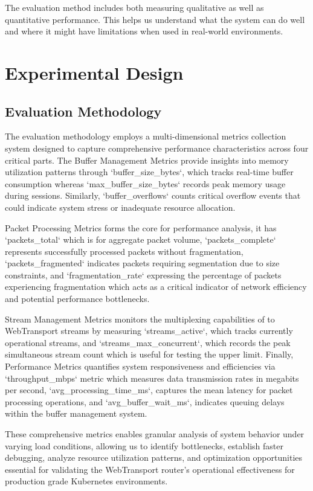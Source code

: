 The evaluation method includes both measuring qualitative as well as quantitative performance. This helps us understand what the system can do well and where it might have limitations when used in real-world environments.


\section{Experimental Design}

\subsection{Evaluation Methodology}

The evaluation methodology employs a multi-dimensional metrics collection system designed to capture comprehensive performance characteristics across four critical parts. The Buffer Management Metrics provide insights into memory utilization patterns through `buffer\_size\_bytes`, which tracks real-time buffer consumption whereas `max\_buffer\_size\_bytes` records peak memory usage during sessions. Similarly, `buffer\_overflows` counts critical overflow events that could indicate system stress or inadequate resource allocation. 

Packet Processing Metrics forms the core for performance analysis, it has `packets\_total` which is for aggregate packet volume, `packets\_complete` represents successfully processed packets without fragmentation, `packets\_fragmented` indicates packets requiring segmentation due to size constraints, and `fragmentation\_rate` expressing the percentage of packets experiencing fragmentation which acts as a critical indicator of network efficiency and potential performance bottlenecks.

Stream Management Metrics monitors the multiplexing capabilities of to WebTransport streams by measuring `streams\_active`, which tracks currently operational streams, and `streams\_max\_concurrent`, which records the peak simultaneous stream count which is useful for testing the upper limit. Finally, Performance Metrics quantifies system responsiveness and efficiencies via `throughput\_mbps` metric which measures data transmission rates in megabits per second, `avg\_processing\_time\_ms`, captures the mean latency for packet processing operations, and `avg\_buffer\_wait\_ms`, indicates queuing delays within the buffer management system. 

These comprehensive metrics enables granular analysis of system behavior under varying load conditions, allowing us to identify bottlenecks, establish faster debugging, analyze resource utilization patterns, and optimization opportunities essential for validating the WebTransport router’s operational effectiveness for production grade Kubernetes environments.


